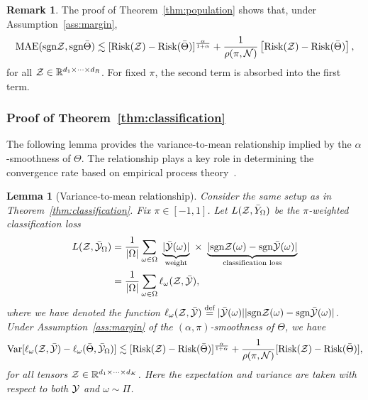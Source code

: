\documentclass[11pt]{article}
\theoremstyle{plain}
\newtheorem{lem}{Lemma}
\theoremstyle{definition}
\newtheorem{rmk}{Remark}
\newcommand*{\KeepStyleUnderBrace}[1]{%
  \mathop{%
    \mathchoice
    {\underbrace{\displaystyle#1}}%
    {\underbrace{\textstyle#1}}%
    {\underbrace{\scriptstyle#1}}%
    {\underbrace{\scriptscriptstyle#1}}%
  }\limits
}
\def\sign{\textup{sgn}}
\def\risk{\textup{Risk}}
\begin{document}
\begin{rmk}\label{eq:rmk}The proof of Theorem~\ref{thm:population} shows that, under Assumption~\ref{ass:margin}, 
\begin{equation}\label{eq:remark}
\textup{MAE}(\sign \tZ,\sign \bar \Theta)  \lesssim [\risk(\tZ)- \risk(\bar \Theta)]^{\alpha\over 1+\alpha}+{1\over \rho(\pi, \tN)} \left[\risk(\tZ)- \risk(\bar \Theta)\right],
\end{equation}
for all $\mathcal{Z}\in\mathbb{R}^{d_1\times \cdots \times d_R}$. For fixed $\pi$, the second term is absorbed into the first term. 
\end{rmk}

\subsubsection{Proof of Theorem~\ref{thm:classification}}
The following lemma provides the variance-to-mean relationship implied by the $\alpha$-smoothness of $\Theta$. The relationship plays a key role in determining the convergence rate based on empirical process theory~\citep{shen1994convergence}. 
\begin{lem}[Variance-to-mean relationship]\label{lem:variance}
Consider the same setup as in Theorem~\ref{thm:classification}. Fix $\pi\in[-1,1]$. Let $L(\mathcal{Z}, \bar Y_\Omega)$ be the $\pi$-weighted classification loss
\begin{align}\label{eq:sample2}
L(\tZ, \bar \tY_\Omega)&= {1\over |\Omega|}\sum_{\omega \in \Omega}\ \KeepStyleUnderBrace{|\bar \tY(\omega)|}_{\text{weight}}\  \times \ \KeepStyleUnderBrace{| \sign \tZ(\omega)-\sign \bar \tY(\omega)|}_{\text{classification loss}}\notag \\
&={1\over |\Omega|}\sum_{\omega \in \Omega}\ell_\omega(\tZ, \bar \tY),
\end{align}
where we have denoted the function $\ell_\omega(\tZ,\bar \tY)\stackrel{\text{def}}{=}|\bar \tY(\omega)||\sign\tZ(\omega)-\sign \bar \tY(\omega)|$. Under Assumption~\ref{ass:margin} of the $(\alpha,\pi)$-smoothness of $\Theta$, we have
\begin{equation}\label{eq:variance}
\textup{Var}[\ell_\omega(\mathcal{Z},\bar {\mathcal{Y}})-\ell_\omega(\bar \Theta, \bar {\mathcal{Y}}_\Omega)]\lesssim [\textup{Risk}(\mathcal{Z})-\textup{Risk}(\bar \Theta)]^{\alpha \over 1+\alpha}+{1\over \rho(\pi, \mathcal{N})}[\textup{Risk}(\mathcal{Z})-\textup{Risk}(\bar \Theta)],
\end{equation}
for all tensors $\mathcal{Z}\in\mathbb{R}^{d_1\times \cdots \times d_K}$. Here the expectation and variance are taken with respect to both $\mathcal{Y}$ and $\omega\sim \Pi$. 
\end{lem}
\end{document}
